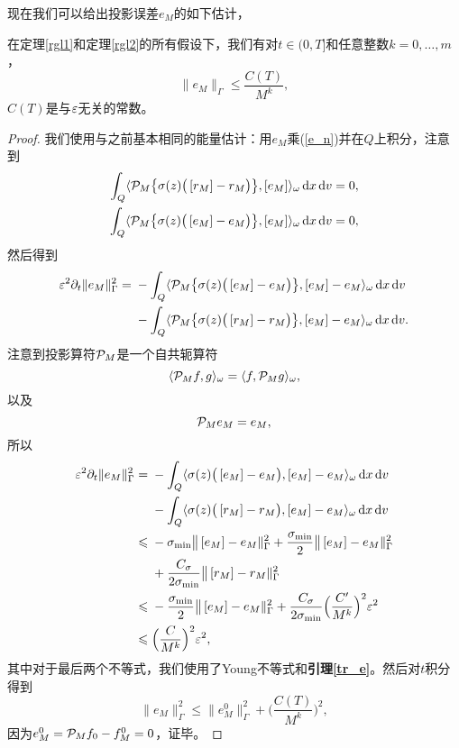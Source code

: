 现在我们可以给出投影误差$e_M$的如下估计，
\begin{lem}\label{pr_e}
  在定理\ref{rgl1}和定理\ref{rgl2}的所有假设下，我们有对$t\in(0,T]$和任意整数$k=0,\ldots,m$，
  \begin{equation}
    \|e_M\|_{\Gamma} \le \frac{C(T)}{M^k},
  \end{equation}
  $C(T)$是与$\varepsilon$无关的常数。
\end{lem}
\begin{proof}
  我们使用与之前基本相同的能量估计：用$e_M$乘(\ref{e_n})并在$Q$上积分，注意到
  \begin{align}
    \int_Q \langle \mathcal{P}_M\big\{\sigma(z)\big(\left[ r_M \right]-r_M \big)\big\}, \left[ e_M \right]\rangle_\omega\mathop{}\!\mathrm{d} x\mathop{}\!\mathrm{d} v = 0,
    \\
    \int_Q \langle \mathcal{P}_M\big\{\sigma(z)\big(\left[ e_M \right]-e_M \big)\big\}, \left[ e_M \right]\rangle_\omega\mathop{}\!\mathrm{d} x\mathop{}\!\mathrm{d} v = 0,
  \end{align}
  然后得到
  \begin{equation}
    \begin{split}
      \varepsilon^2\partial_t\|e_M\|^2_{\Gamma} =
      {} & -\int_Q \langle \mathcal{P}_M\big\{\sigma(z)\big(\left[ e_M \right]-e_M \big)\big\}, \left[ e_M \right] - e_M\rangle_\omega\mathop{}\!\mathrm{d} x\mathop{}\!\mathrm{d} v
      \\
      {} & -\int_Q \langle \mathcal{P}_M\big\{\sigma(z)\big(\left[ r_M \right]-r_M \big)\big\}, \left[ e_M \right]-e_M\rangle_\omega\mathop{}\!\mathrm{d} x\mathop{}\!\mathrm{d} v.
    \end{split}
  \end{equation}
  注意到投影算符$\mathcal{P}_M$是一个自共轭算符
  \[
    \langle \mathcal{P}_M f, g\rangle_\omega = \langle f, \mathcal{P}_M g\rangle_\omega,
  \]
  以及
  \[
    \mathcal{P}_M e_M = e_M,
  \]
  所以
  \begin{equation}
    \begin{split}
      \varepsilon^2\partial_t\|e_M\|^2_{\Gamma} =
      {} & -\int_Q \langle\sigma(z)\big(\left[ e_M \right]-e_M \big), \left[ e_M \right] - e_M\rangle_\omega\mathop{}\!\mathrm{d} x\mathop{}\!\mathrm{d} v
      \\
      {} & -\int_Q \langle\sigma(z)\big(\left[ r_M \right]-r_M \big), \left[ e_M \right]-e_M\rangle_\omega\mathop{}\!\mathrm{d} x\mathop{}\!\mathrm{d} v
      \\
      \leqslant {} & -\sigma_{\mathrm{min}}\big\|\left[ e_M \right]-e_M\|^2_{\Gamma} + \frac{\sigma_{\mathrm{min}}}{2}\big\|\left[ e_M \right]-e_M\|^2_{\Gamma}
      \\
      {} & + \frac{C_\sigma}{2\sigma_{\mathrm{min}}}\big\|\left[ r_M \right]-r_M\|^2_{\Gamma}
      \\
      \leqslant {} & -\frac{\sigma_{\mathrm{min}}}{2}\big\|\left[ e_M \right]-e_M\|^2_{\Gamma} + \frac{C_\sigma}{2\sigma_{\mathrm{min}}}\Big(\frac{C'}{M^k}\Big)^2\varepsilon^2
      \\
      \leqslant {} & \Big(\frac{C}{M^k}\Big)^2\varepsilon^2,
    \end{split}
  \end{equation}
  其中对于最后两个不等式，我们使用了Young不等式和{\bf 引理\ref{tr_e}}。然后对$t$积分得到
  \begin{equation}
    \|e_M\|^2_{\Gamma} \le \|e^0_M\|^2_{\Gamma} + \Big(\frac{C(T)}{M^k}\Big)^2,
  \end{equation}
  因为$e ^ 0_M = \mathcal{P}_M f_0 - f^0_M = 0$，证毕。
\end{proof}

